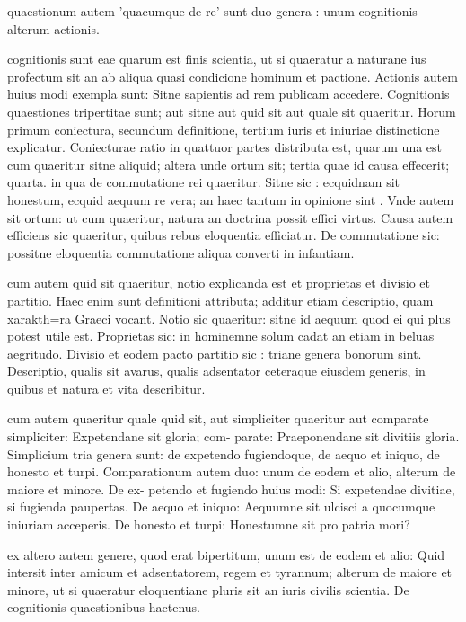  quaestionum autem 'quacumque de re' sunt duo genera : unum cognitionis alterum actionis.

 cognitionis sunt eae quarum est finis scientia, ut si quaeratur a naturane ius profectum sit an ab aliqua quasi condicione hominum et pactione. Actionis autem huius modi exempla sunt: Sitne sapientis ad rem publicam accedere. Cognitionis quaestiones tripertitae sunt; aut sitne aut quid sit aut quale sit quaeritur. Horum primum coniectura, secundum definitione, tertium iuris et iniuriae distinctione explicatur. Coniecturae ratio in quattuor partes distributa est, quarum una est cum quaeritur sitne aliquid; altera unde ortum sit; tertia quae id causa effecerit; quarta. in qua de commutatione rei quaeritur. Sitne sic : ecquidnam sit honestum, ecquid aequum re vera; an haec tantum in opinione sint . Vnde autem sit ortum: ut cum quaeritur, natura an doctrina possit effici virtus. Causa autem efficiens sic quaeritur, quibus rebus eloquentia efficiatur. De commutatione sic: possitne eloquentia commutatione aliqua converti in infantiam.

 cum autem quid sit quaeritur, notio explicanda est et proprietas et divisio et partitio. Haec enim sunt definitioni attributa; additur etiam descriptio, quam xarakth=ra Graeci vocant. Notio sic quaeritur: sitne id aequum quod ei qui plus potest utile est. Proprietas sic: in hominemne solum cadat an etiam in beluas aegritudo. Divisio et eodem pacto partitio sic : triane genera bonorum sint. Descriptio, qualis sit avarus, qualis adsentator ceteraque eiusdem generis, in quibus et natura et vita describitur.

 cum autem quaeritur quale quid sit, aut simpliciter quaeritur aut comparate simpliciter: Expetendane sit gloria; com- parate: Praeponendane sit divitiis gloria. Simplicium tria genera sunt: de expetendo fugiendoque, de aequo et iniquo, de honesto et turpi. Comparationum autem duo: unum de eodem et alio, alterum de maiore et minore. De ex- petendo et fugiendo huius modi: Si expetendae divitiae, si fugienda paupertas. De aequo et iniquo: Aequumne sit ulcisci a quocumque iniuriam acceperis. De honesto et turpi: Honestumne sit pro patria mori?

 ex altero autem genere, quod erat bipertitum, unum est de eodem et alio: Quid intersit inter amicum et adsentatorem, regem et tyrannum; alterum de maiore et minore, ut si quaeratur eloquentiane pluris sit an iuris civilis scientia. De cognitionis quaestionibus hactenus.

